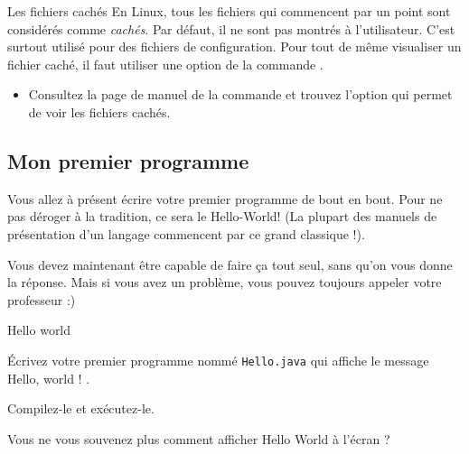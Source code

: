 \documentclass[a4paper,11pt]{article}
\begin{document}
			
		\begin{Exercice}{Les fichiers cach\'es} 
			En Linux, tous les fichiers qui commencent par un point sont consid\'er\'es comme \textit{cach\'es}.
			Par d\'efaut, il ne sont pas montr\'es \`a l'utilisateur. C'est surtout utilis\'e pour des fichiers de configuration.
			Pour tout de m\^eme visualiser un fichier cach\'e, il faut utiliser une option de la commande \verb@ls@.
		
           		 \par
			\begin{itemize}
				\item Consultez la page de manuel de la commande \verb@ls@ et trouvez l'option qui permet de voir
					les fichiers cach\'es.
			\end{itemize}
		\end{Exercice}
            		\par
        \subsection{Mon premier programme}  
  
          	Vous allez \`a pr\'esent \'ecrire votre premier programme de bout en bout. Pour ne pas d\'eroger \`a la tradition, ce sera le \guillemotleft  Hello-World! \guillemotright    
          	(La plupart des manuels de pr\'esentation d'un langage commencent par ce grand classique !).  
        
           	 \par
          
          	Vous devez maintenant \^etre capable de faire \c ca tout seul, sans qu'on vous donne la r\'eponse. Mais si vous avez un probl\`eme, vous pouvez toujours 
		appeler votre professeur :)   
        
           	 \par
        
		\clearpage	
		\begin{Tutoriel}{Hello world} 					
			\begin{steps}
				\item \'Ecrivez votre premier programme nomm\'e \verb|Hello.java| qui affiche le message  \guillemotleft  Hello, world ! \guillemotright .
				\item Compilez-le et ex\'ecutez-le.
			\end{steps}
		\end{Tutoriel}		  
          	Vous ne vous souvenez plus comment afficher  \guillemotleft  Hello World \guillemotright  \`a l'\'ecran ?  
        
\end{document}
